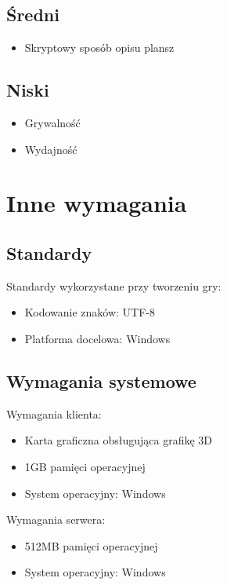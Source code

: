 \documentclass[12pt,a4paper,twoside]{article}
\begin{document}
\subsection{Średni}
\begin{itemize}
\item Skryptowy sposób opisu plansz
\end{itemize}
\subsection{Niski}
\begin{itemize}
\item Grywalność
\item Wydajność
\end{itemize}

\section{Inne wymagania}


\subsection{Standardy}


Standardy wykorzystane przy tworzeniu gry:
\begin{itemize}
\item Kodowanie znaków: UTF-8
\item Platforma docelowa: Windows
\end{itemize}

\subsection{Wymagania systemowe}


Wymagania klienta:
\begin{itemize}
\item Karta graficzna obsługująca grafikę 3D
\item 1GB pamięci operacyjnej
\item System operacyjny: Windows
\end{itemize}
Wymagania serwera:
\begin{itemize}
\item 512MB pamięci operacyjnej
\item System operacyjny: Windows
\end{itemize}
\end{document}
